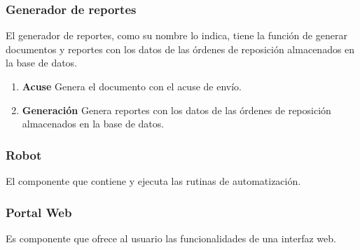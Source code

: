 \subsubsection{Generador de reportes}
El generador de reportes, como su nombre lo indica, tiene la función de generar documentos y reportes con los datos de las órdenes de reposición almacenados en la base de datos. 
\begin{enumerate}
\item \textbf{Acuse} Genera el documento con el acuse de envío.
\item \textbf{Generación} Genera reportes con los datos de las órdenes de reposición almacenados en la base de datos.
\end{enumerate}

\subsubsection{Robot}
El componente que contiene y ejecuta las rutinas de automatización. 

\subsubsection{Portal Web}
Es componente que ofrece al usuario las funcionalidades de una interfaz web. 


